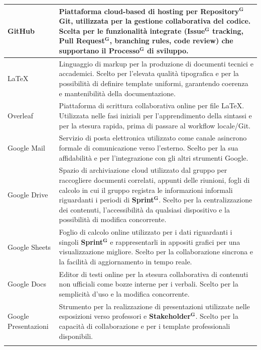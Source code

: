 \documentclass[a4paper,12pt]{article}
\newcommand{\term}[1]{\textbf{#1}$^\mathbf{G}$}
\begin{document}
\begin{center}
\begin{longtable}{| m{3cm} | m{} |}
\hline
\rowcolor{gray!20}
\centering GitHub & Piattaforma cloud-based di hosting per \term{Repository} Git, utilizzata per la gestione collaborativa del codice. Scelta per le funzionalità integrate (\term{Issue} tracking, \term{Pull Request}, branching rules, code review) che supportano il \term{Processo} di sviluppo.\\
\hline
\rowcolor{white}
\centering \LaTeX & Linguaggio di markup per la produzione di documenti tecnici e accademici. Scelto per l’elevata qualità tipografica e per la possibilità di definire template uniformi, garantendo coerenza e mantenibilità della documentazione.\\
\hline
\rowcolor{gray!20}
\centering Overleaf & Piattaforma di scrittura collaborativa online per file LaTeX. Utilizzata nelle fasi iniziali per l'apprendimento della sintassi e per la stesura rapida, prima di passare al workflow locale/Git.\\
\hline
\rowcolor{white}
\centering Google Mail & Servizio di posta elettronica utilizzato come canale asincrono formale di comunicazione verso l’esterno. Scelto per la sua affidabilità e per l’integrazione con gli altri strumenti Google.\\
\hline
\rowcolor{gray!20}
\centering Google Drive & Spazio di archiviazione cloud utilizzato dal gruppo per raccogliere documenti correlati, appunti delle riunioni, fogli di calcolo in cui il gruppo registra le informazioni informali riguardanti i periodi di \term{Sprint}. Scelto per la centralizzazione dei contenuti, l’accessibilità da qualsiasi dispositivo e la possibilità di modifica concorrente.\\
\hline
\rowcolor{white}
\centering Google Sheets & Foglio di calcolo online utilizzato per i dati riguardanti i singoli \term{Sprint} e rappresentarli in appositi grafici per una visualizzazione migliore. Scelto per la collaborazione sincrona e la facilità di aggiornamento in tempo reale.\\
\hline
\rowcolor{gray!20}
\centering Google Docs & Editor di testi online per la stesura collaborativa di contenuti non ufficiali come bozze interne per i verbali. Scelto per la semplicità d’uso e la modifica concorrente.\\
\hline
\rowcolor{white}
\centering Google Presentazioni & Strumento per la realizzazione di presentazioni utilizzate nelle esposizioni verso professori e \term{Stakeholder}. Scelto per la capacità di collaborazione e per i template professionali disponibili.\\
\hline
\rowcolor{gray!20}

\end{longtable}
\end{center}
\end{document}
